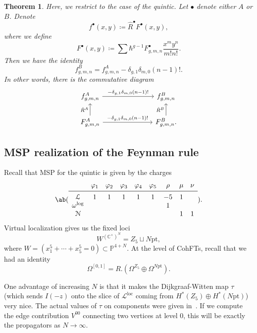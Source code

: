 \documentclass[10pt,oldfontcommands,oneside]{memoir}
\newtheorem{thm}{Theorem}[section]
\theoremstyle{definition}
\theoremstyle{remark}
\theoremstyle{plain}
\theoremstyle{definition}
\theoremstyle{remark}
\newcommand{\C}{\mathbb{C}}
\renewcommand{\P}{\mathbb{P}}
\newcommand{\mc}[1]{\mathcal{#1}}
\newcommand{\mr}[1]{\mathrm{#1}}
\newcommand{\on}[1]{\operatorname{#1}}
\newcommand{\1}{\mathbf{1}}
\newcommand{\2}{\mathbf{2}}
\newcommand{\3}{\mathbf{3}}
\newcommand{\pt}{\mr{pt}}
\begin{document}
\begin{thm}
    Here, we restrict to the case of the quintic. Let $\bullet$ denote either $A$ or $B$. Denote
    \[ f^{\bullet}(x,y) \coloneqq \hat{R}^{\bullet} F^{\bullet}(x,y), \]
    where we define
    \[ F^{\bullet}(x,y) \coloneqq \sum \hbar^{g-1} F_{g,m,n}^{\bullet} \frac{x^m y^n}{m! n!}. \]
    Then we have the identity
    \[ f_{g,m,n}^B = f_{g,m,n}^A - \delta_{g,1} \delta_{m,0} (n-1)!. \]
    In other words, there is the commutative diagram
    \begin{equation*}
    \begin{tikzcd}
        f_{g,m,n}^A \ar{rrr}{-\delta_{g,1}\delta_{m,0}(n-1)!} & & & f_{g,m,n}^B \\
        F_{g,m,n}^A \ar{rrr}{-\delta_{g,1} \delta_{m,0}(n-1)!} \ar{u}{\hat{R}^A} & & & F_{g,m,n}^B \ar{u}{\hat{R}^B}.
    \end{tikzcd}
    \end{equation*}
\end{thm}

\subsection{MSP realization of the Feynman rule}%
\label{sub:MSP realization of the Feynman rule}

Recall that MSP for the quintic is given by the charges
\[ \ab(\begin{array}{ccccccccc}
    & \varphi_1 & \varphi_2 & \varphi_3 & \varphi_4 & \varphi_5 & \rho & \mu & \nu \\
    \midrule
    \mc{L} & 1 & 1 & 1 & 1 & 1 & -5 & 1 \\
    \omega^{\log} & & & & & &  1 & &  \\
    \mc{N} & & & & & & & 1 & 1
\end{array}). \]
Virtual localization gives us the fixed loci
\[ W^{(\C^{\times})^N} = Z_5 \sqcup N\pt, \]
where $W = (x_1^5 + \cdots +x_5^5 = 0) \subset \P^{4+N}$. At the level of CohFTs, recall that we had an identity
\[ \Omega^{[0,1]} = R . (\Omega^{Z_5} \oplus \Omega^{N\pt}). \]

One advantage of increasing $N$ is that it makes the Dijkgraaf-Witten map $\tau$ (which sends $I(-z)$ onto the slice of $\mc{L}^{\on{loc}}$ coming from $H^*(Z_5) \oplus H^*(N\pt)$) very nice. The actual values of $\tau$ on components were given in~. If we compute the edge contribution $V^{00}$ connecting two vertices at level $0$, this will be exactly the propagators as $N \to \infty$.
\end{document}
